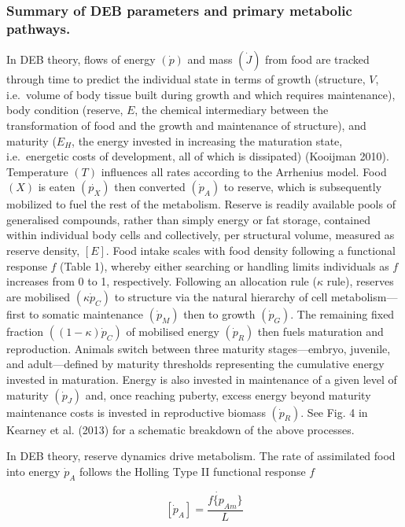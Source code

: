 \documentclass[]{article}
\begin{document}
\subsubsection{Summary of DEB parameters and primary metabolic
pathways.}\label{summary-of-deb-parameters-and-primary-metabolic-pathways.}

In DEB theory, flows of energy \((\dot{p})\) and mass \((\dot{J})\) from
food are tracked through time to predict the individual state in terms
of growth (structure, \(V\), i.e.~volume of body tissue built during
growth and which requires maintenance), body condition (reserve, \(E\),
the chemical intermediary between the transformation of food and the
growth and maintenance of structure), and maturity (\(E_H\), the energy
invested in increasing the maturation state, i.e.~energetic costs of
development, all of which is dissipated) (Kooijman 2010). Temperature
\((T)\) influences all rates according to the Arrhenius model. Food
\((X)\) is eaten \((\dot{p_X})\) then converted \((\dot{p}_A)\) to
reserve, which is subsequently mobilized to fuel the rest of the
metabolism. Reserve is readily available pools of generalised compounds,
rather than simply energy or fat storage, contained within individual
body cells and collectively, per structural volume, measured as reserve
density, \([E]\). Food intake scales with food density following a
functional response \(f\) (Table 1), whereby either searching or
handling limits individuals as \(f\) increases from 0 to 1,
respectively. Following an allocation rule (\(\kappa\) rule), reserves
are mobilised \((\kappa \dot{p}_C)\) to structure via the natural
hierarchy of cell metabolism---first to somatic maintenance
\((\dot{p}_M)\) then to growth \((\dot{p}_G)\). The remaining fixed
fraction \(((1 - \kappa)\dot{p}_C)\) of mobilised energy \((\dot{p}_R)\)
then fuels maturation and reproduction. Animals switch between three
maturity stages---embryo, juvenile, and adult---defined by maturity
thresholds representing the cumulative energy invested in maturation.
Energy is also invested in maintenance of a given level of maturity
\((\dot{p}_J)\) and, once reaching puberty, excess energy beyond
maturity maintenance costs is invested in reproductive biomass
\((\dot{p}_R)\). See Fig. 4 in Kearney et al. (2013) for a schematic
breakdown of the above processes.

In DEB theory, reserve dynamics drive metabolism. The rate of
assimilated food into energy \(\dot{p}_A\) follows the Holling Type II
functional response \(f\)

\[
  [\dot{p}_A] = \frac
  {f \dot{\{p}_{Am}\}}
  {L}
\]
\end{document}
